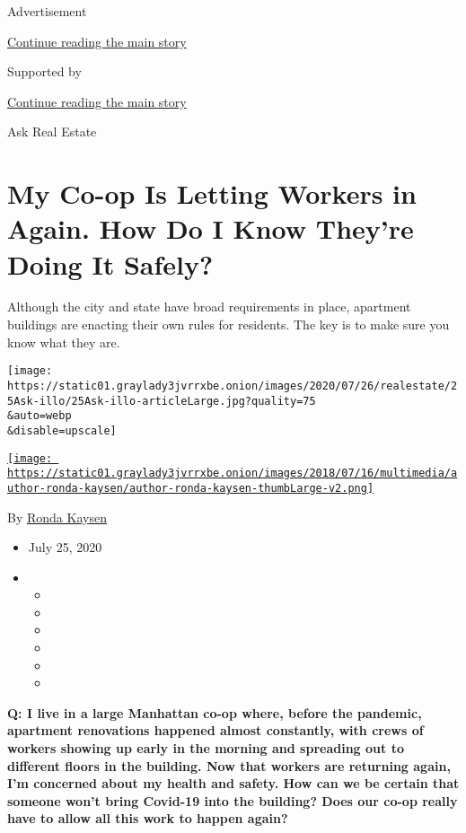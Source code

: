 Advertisement

\protect\hyperlink{after-top}{Continue reading the main story}

Supported by

\protect\hyperlink{after-sponsor}{Continue reading the main story}

Ask Real Estate

\hypertarget{my-co-op-is-letting-workers-in-again-how-do-i-know-theyre-doing-it-safely}{%
\section{My Co-op Is Letting Workers in Again. How Do I Know They're
Doing It
Safely?}\label{my-co-op-is-letting-workers-in-again-how-do-i-know-theyre-doing-it-safely}}

Although the city and state have broad requirements in place, apartment
buildings are enacting their own rules for residents. The key is to make
sure you know what they are.

\texttt{[image: https://static01.graylady3jvrrxbe.onion/images/2020/07/26/realestate/25Ask-illo/25Ask-illo-articleLarge.jpg?quality=75\\\&auto=webp\\\&disable=upscale]}

\href{https://www.nytimes3xbfgragh.onion/by/ronda-kaysen}{\texttt{[image: https://static01.graylady3jvrrxbe.onion/images/2018/07/16/multimedia/author-ronda-kaysen/author-ronda-kaysen-thumbLarge-v2.png]}}

By \href{https://www.nytimes3xbfgragh.onion/by/ronda-kaysen}{Ronda
Kaysen}

\begin{itemize}
\item
  July 25, 2020
\item
  \begin{itemize}
  \item
  \item
  \item
  \item
  \item
  \item
  \end{itemize}
\end{itemize}

\textbf{Q: I live in a large Manhattan co-op where, before the pandemic,
apartment renovations happened almost constantly, with crews of workers
showing up early in the morning and spreading out to different floors in
the building. Now that workers are returning again, I'm concerned about
my health and safety. How can we be certain that someone won't bring
Covid-19 into the building? Does our co-op really have to allow all this
work to happen again?}

